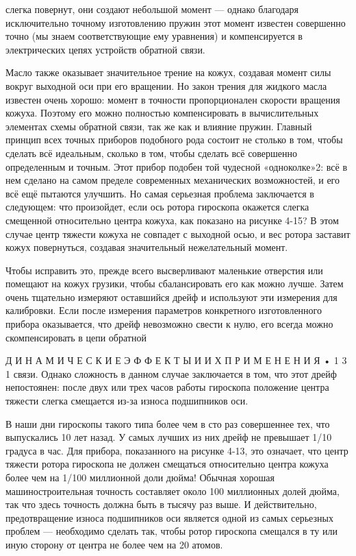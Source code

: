 \documentclass[10pt,oneside]{article}
\begin{document}
слегка повернут, они создают небольшой момент --- однако благодаря исключительно точному изготовлению пружин этот момент известен совершенно точно (мы знаем соответствующие ему уравнения) и компенсируется в электрических цепях устройств обратной связи.\par

Масло также оказывает значительное трение на кожух, создавая момент силы вокруг выходной оси при его вращении. Но закон трения для жидкого масла известен очень хорошо: момент в точности пропорционален скорости вращения кожуха. Поэтому его можно полностью компенсировать в вычислительных элементах схемы обратной связи, так же как и влияние пружин. Главный принцип всех точных приборов подобного рода состоит не столько в том, чтобы сделать всё идеальным, сколько в том, чтобы сделать всё совершенно определенным и точным. Этот прибор подобен той чудесной «одноколке»2: всё в нем сделано на самом пределе современных механических возможностей, и его всё ещё пытаются улучшить. Но самая серьезная проблема заключается в следующем: что произойдет, если ось ротора гироскопа окажется слегка смещенной относительно центра кожуха, как показано на рисунке 4-15? В этом случае центр тяжести кожуха не совпадет с выходной осью, и вес ротора заставит кожух повернуться, создавая значительный нежелательный момент.\par

Чтобы исправить это, прежде всего высверливают маленькие отверстия или помещают на кожух грузики, чтобы сбалансировать его как можно лучше. Затем очень тщательно измеряют оставшийся дрейф и используют эти измерения для калибровки. Если после измерения параметров конкретного изготовленного прибора оказывается, что дрейф невозможно свести к нулю, его всегда можно скомпенсировать в цепи обратной\par

Д И Н А М И Ч Е С К И Е  Э Ф Ф Е К Т Ы  И  И Х  П Р И М Е Н Е Н И Я • 1 3 1 связи. Однако сложность в данном случае заключается в том, что этот дрейф непостоянен: после двух или трех часов работы гироскопа положение центра тяжести слегка смещается из-за износа подшипников оси.\par

В наши дни гироскопы такого типа более чем в сто раз совершеннее тех, что выпускались 10 лет назад. У самых лучших из них дрейф не превышает 1/10 градуса в час. Для прибора, показанного на рисунке 4-13, это означает, что центр тяжести ротора гироскопа не должен смещаться относительно центра кожуха более чем на 1/100 миллионной доли дюйма! Обычная хорошая машиностроительная точность составляет около 100 миллионных долей дюйма, так что здесь точность должна быть в тысячу раз выше. И действительно, предотвращение износа подшипников оси является одной из самых серьезных проблем --- необходимо сделать так, чтобы ротор гироскопа смещался в ту или иную сторону от центра не более чем на 20 атомов.\par
\end{document}
